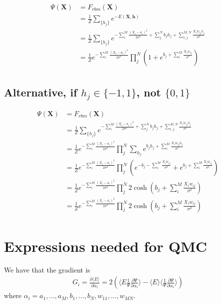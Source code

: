 \documentclass[norsk,a4paper,11pt]{article}
\begin{document}
\begin{align}
\Psi (\mathbf{X}) &= F_{rbm}(\mathbf{X}) \\
&= \frac{1}{Z}\sum_{\{h_j\}} e^{-E(\mathbf{X}, \mathbf{h})} \\
&= \frac{1}{Z} \sum_{\{h_j\}} e^{-\sum_i^M \frac{(X_i - a_i)^2}{2\sigma^2} + \sum_j^N b_j h_j + \sum_{i,j}^{M,N} \frac{X_i w_{ij} h_j}{\sigma^2}} \\
&= \frac{1}{Z} e^{-\sum_i^M \frac{(X_i - a_i)^2}{2\sigma^2}} \prod_j^N (1 + e^{b_j + \sum_i^M \frac{X_i w_{ij}}{\sigma^2}}) \\
\end{align}

\subsection{Alternative, if $h_j \in \{-1, 1\}$, not $\{0, 1\}$}
\begin{align}
\Psi (\mathbf{X}) &= F_{rbm}(\mathbf{X}) \\
&= \frac{1}{Z} \sum_{\{h_j\}} e^{-\sum_i^M \frac{(X_i - a_i)^2}{2\sigma^2} + \sum_j^N b_j h_j + \sum_{i,j}^{M,N} \frac{X_i w_{ij} h_j}{\sigma^2}} \\
&= \frac{1}{Z} e^{-\sum_i^M \frac{(X_i - a_i)^2}{2\sigma^2}} \prod_j^N \sum_{h_j}  e^{b_j h_j + \sum_i^M \frac{X_i w_{ij} h_j}{\sigma^2}} \\
&= \frac{1}{Z} e^{-\sum_i^M \frac{(X_i - a_i)^2}{2\sigma^2}} \prod_j^N ( e^{-b_j - \sum_i^M \frac{X_i w_{ij}}{\sigma^2}} + e^{b_j + \sum_i^M \frac{X_i w_{ij}}{\sigma^2}})  \\
&= \frac{1}{Z} e^{-\sum_i^M \frac{(X_i - a_i)^2}{2\sigma^2}} \prod_j^N 2\cosh(b_j + \sum_i^M \frac{X_i w_{ij}}{\sigma^2})\\
&= \frac{1}{Z} e^{-\sum_i^M \frac{(X_i - a_i)^2}{2\sigma^2}} \prod_j^N 2\cosh(b_j + \sum_i^M \frac{X_i w_{ij}}{\sigma^2}) \\
\end{align}


\section{Expressions needed for QMC}


We have that the gradient is \cite{jorgenthesis}
\begin{align}
	G_i = \frac{\partial \langle E \rangle}{\partial \alpha_i}
	= 2(\langle E \frac{1}{\Psi}\frac{\partial \Psi}{\partial \alpha_i} \rangle - \langle E \rangle \langle \frac{1}{\Psi}\frac{\partial \Psi}{\partial \alpha_i} \rangle )
\end{align}
where $\alpha_i = a_1,...,a_M,b_1,...,b_N,w_{11},...,w_{MN}$.
\end{document}
